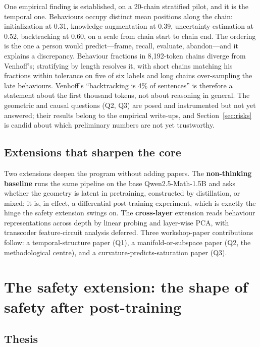 \documentclass[10pt]{article}
\begin{document}
One empirical finding is established, on a 20-chain stratified pilot, and it is the
temporal one. Behaviours occupy distinct mean positions along the chain:
initialization at 0.31, knowledge augmentation at 0.39, uncertainty estimation at
0.52, backtracking at 0.60, on a scale from chain start to chain end. The ordering
is the one a person would predict---frame, recall, evaluate, abandon---and it
explains a discrepancy. Behaviour fractions in 8{,}192-token chains diverge from
Venhoff's; stratifying by length resolves it, with short chains matching his
fractions within tolerance on five of six labels and long chains over-sampling the
late behaviours. Venhoff's ``backtracking is 4\% of sentences'' is therefore a
statement about the first thousand tokens, not about reasoning in general. The
geometric and causal questions (Q2, Q3) are posed and instrumented but not yet
answered; their results belong to the empirical write-ups, and Section~\ref{sec:risks}
is candid about which preliminary numbers are not yet trustworthy.

\subsection{Extensions that sharpen the core}

Two extensions deepen the program without adding papers. The \textbf{non-thinking
baseline} runs the same pipeline on the base Qwen2.5-Math-1.5B and asks whether the
geometry is latent in pretraining, constructed by distillation, or mixed; it is, in
effect, a differential post-training experiment, which is exactly the hinge the
safety extension swings on. The \textbf{cross-layer} extension reads behaviour
representations across depth by linear probing and layer-wise PCA, with transcoder
feature-circuit analysis deferred. Three workshop-paper contributions follow: a
temporal-structure paper (Q1), a manifold-or-subspace paper (Q2, the methodological
centre), and a curvature-predicts-saturation paper (Q3).

\section{The safety extension: the shape of safety after post-training}
\label{sec:safety}

\subsection{Thesis}
\end{document}
